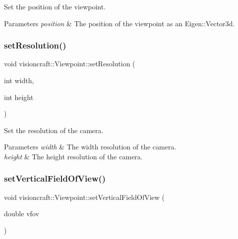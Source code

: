 Set the position of the viewpoint. 


\begin{DoxyParams}{Parameters}
{\em position} & The position of the viewpoint as an Eigen\+::\+Vector3d. \\
\hline
\end{DoxyParams}
\mbox{\label{classvisioncraft_1_1Viewpoint_a82bc5bda68c1dc61c35cfd8f5a2befa8}} 
\subsubsection{\texorpdfstring{set\+Resolution()}{setResolution()}}
{\footnotesize\ttfamily void visioncraft\+::\+Viewpoint\+::set\+Resolution (\begin{DoxyParamCaption}\item[{int}]{width,  }\item[{int}]{height }\end{DoxyParamCaption})}



Set the resolution of the camera. 


\begin{DoxyParams}{Parameters}
{\em width} & The width resolution of the camera. \\
\hline
{\em height} & The height resolution of the camera. \\
\hline
\end{DoxyParams}
\mbox{\label{classvisioncraft_1_1Viewpoint_a3c2c3034d8bab1520d95baff61ed3ec0}} 
\subsubsection{\texorpdfstring{set\+Vertical\+Field\+Of\+View()}{setVerticalFieldOfView()}}
{\footnotesize\ttfamily void visioncraft\+::\+Viewpoint\+::set\+Vertical\+Field\+Of\+View (\begin{DoxyParamCaption}\item[{double}]{vfov }\end{DoxyParamCaption})}



